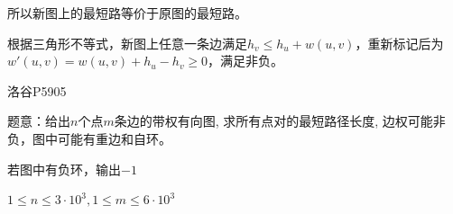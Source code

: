 所以新图上的最短路等价于原图的最短路。\par

根据三角形不等式，新图上任意一条边满足$\displaystyle h_v \leq h_u + w(u, v)$，重新标记后为$\displaystyle w'(u, v) = w(u, v) + h_u - h_v \geq 0$，满足非负。\par


洛谷P5905\par

题意：给出$n$个点$m$条边的带权有向图, 求所有点对的最短路径长度, 边权可能非负，图中可能有重边和自环。\par

若图中有负环，输出$-1$\par

$1 \leq n \leq 3 \cdot 10^3, 1 \leq m \leq 6 \cdot 10^3$\par



